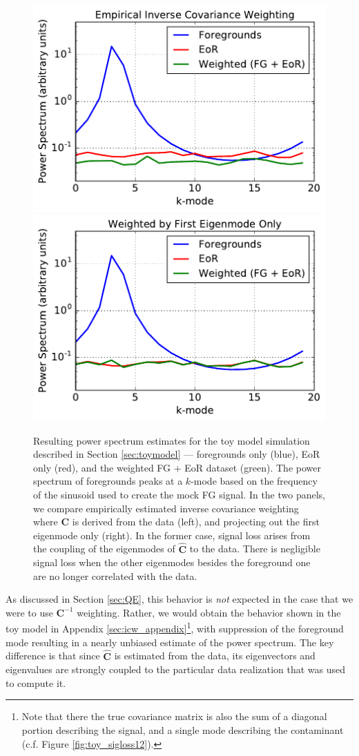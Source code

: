 \documentclass[preprint2,numberedappendix,tighten]{aastex6}  %
\begin{document}
\begin{figure}
	\centering
	\includegraphics[trim={0cm 0cm 0cm 0cm},clip,height=0.33\textwidth]{plots/toy_sigloss3.pdf}
	\includegraphics[trim={0cm 0cm 0cm 0cm},clip,height=0.33\textwidth]{plots/toy_sigloss4.pdf}
	\caption{Resulting power spectrum estimates for the toy model simulation described in Section \ref{sec:toymodel} --- foregrounds only (blue), EoR only (red), and the weighted FG + EoR dataset (green). The power spectrum of foregrounds peaks at a $k$-mode based on the frequency of the sinusoid used to create the mock FG signal. In the two panels, we compare empirically estimated inverse covariance weighting where $\textbf{C}$ is derived from the data (left), and projecting out the first eigenmode only (right). In the former case, signal loss arises from the coupling of the eigenmodes of $\widehat{\textbf{C}}$ to the data. 
There is negligible signal loss when the other eigenmodes besides the foreground one are no longer correlated with the data.
}
	\label{fig:toy_sigloss3}
\end{figure}

As discussed in Section \ref{sec:QE}, this behavior is {\it not} expected in the case that we were to use $\textbf{C}^{-1}$ weighting.  Rather, we would obtain the behavior shown in the toy model in Appendix \ref{sec:icw_appendix}\footnote{Note that there the true covariance matrix is also the sum of a diagonal portion describing the signal, and a single mode describing the contaminant (c.f. Figure \ref{fig:toy_sigloss12}).}, with suppression of the foreground mode resulting in a nearly unbiased estimate of the power spectrum.   The key difference is that since $\widehat{\textbf{C}}$ is estimated from the data, its eigenvectors and eigenvalues are strongly coupled to the particular data realization that was used to compute it. 
\end{document}
